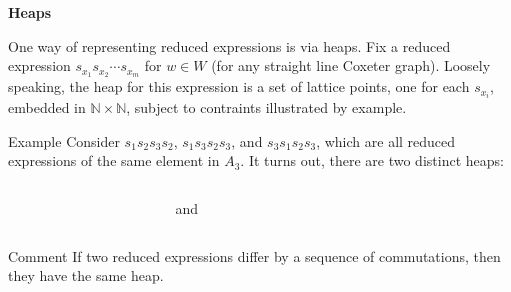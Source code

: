 \documentclass[9pt,handout]{beamer}
\newcommand{\<}{\langle}
\renewcommand{\>}{\rangle}
\begin{document}
\begin{frame}{\textbf{Heaps}}

One way of representing reduced expressions is via \alert{heaps}.  Fix a reduced expression $s_{x_1}s_{x_2}\cdots s_{x_m}$ for $w\in W$ (for any straight line Coxeter graph).  Loosely speaking, the heap for this expression is a set of lattice points, one for each $s_{x_{i}}$, embedded in $\mathbb{N}\times \mathbb{N}$, subject to contraints illustrated by example.


\pause

\begin{block}{Example}
Consider {\color{blue!60}$s_{1}s_{2}s_{3}s_{2}$}, {\color{red}$s_{1}s_{3}s_{2}s_{3}$}, and {\color{red}$s_{3}s_{1}s_{2}s_{3}$}, which are all reduced expressions of the same element in $A_{3}$. It turns out, there are two distinct heaps:
\begin{columns}
\begin{column}{.4\linewidth}
\begin{center}
\end{center}
\end{column}

\begin{column}{.1\linewidth}
\begin{center}
and
\end{center}
\end{column}

\begin{column}{.4\linewidth}
\begin{center}
\end{center}
\end{column}
\end{columns}
\end{block}

\pause

\begin{block}{Comment}
If two reduced expressions differ by a sequence of commutations, then they have the same heap.
\end{block}

\end{frame}
\end{document}

